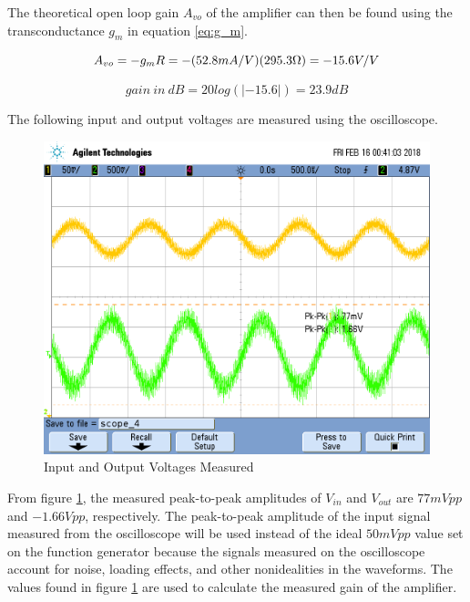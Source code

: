 The theoretical open loop gain $A_{vo}$ of the amplifier can then be found using the transconductance $g_m$ in equation \ref{eq:g_m}.

\FloatBarrier

\begin{equation}
	\label{eq:theoretical_gain}
	A_{vo} = -g_mR = -(52.8 mA/V)(295.3 \Omega) = -15.6 V/V \\
\end{equation}

\begin{equation}
	\label{eq:theoretical_gain_db}
        gain \ in \ dB = 20 log(|-15.6|) = 23.9 dB
\end{equation}

\FloatBarrier

The following input and output voltages are measured using the oscilloscope.

\FloatBarrier

\begin{figure}[h!]
	\centering
		\includegraphics[scale=0.35]{./images/scope_4.png}
		\caption{Input and Output Voltages Measured}
		\label{fig:measured_vin_vout}
\end{figure}

\FloatBarrier

From figure \ref{fig:measured_vin_vout}, the measured peak-to-peak amplitudes of $V_{in}$ and $V_{out}$ are $77 mVpp$ and $-1.66 Vpp$, respectively.
The peak-to-peak amplitude of the input signal measured from the oscilloscope will be used instead of the ideal $50 mVpp$ value set on the function generator because the signals measured on the oscilloscope account for noise, loading effects, and other nonidealities in the waveforms.
The values found in figure \ref{fig:measured_vin_vout} are used to calculate the measured gain of the amplifier.

